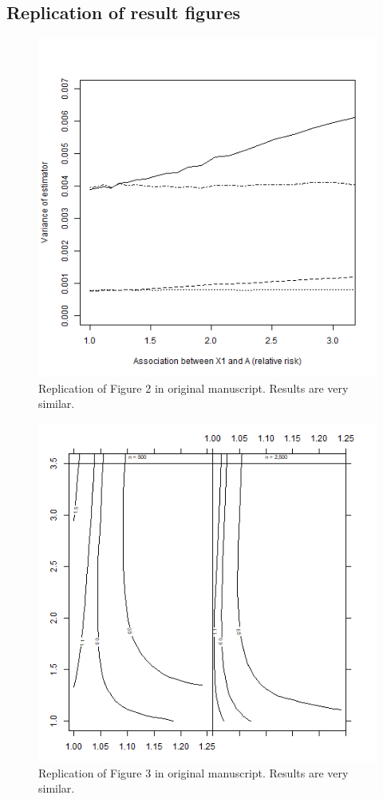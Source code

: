 \documentclass[10,a4paperpaper,]{article}
\begin{document}
\subsection{Replication of result figures}

\begin{figure}
\includegraphics[width=450pt]{../../figures/Figure2} \caption{Replication of Figure 2 in original manuscript. Results are very similar.}\label{fig:unnamed-chunk-1}
\end{figure}
\begin{figure}
\includegraphics[width=450pt]{../../figures/Figure3} \caption{Replication of Figure 3 in original manuscript. Results are very similar.}\label{fig:unnamed-chunk-2}
\end{figure}
\end{document}
